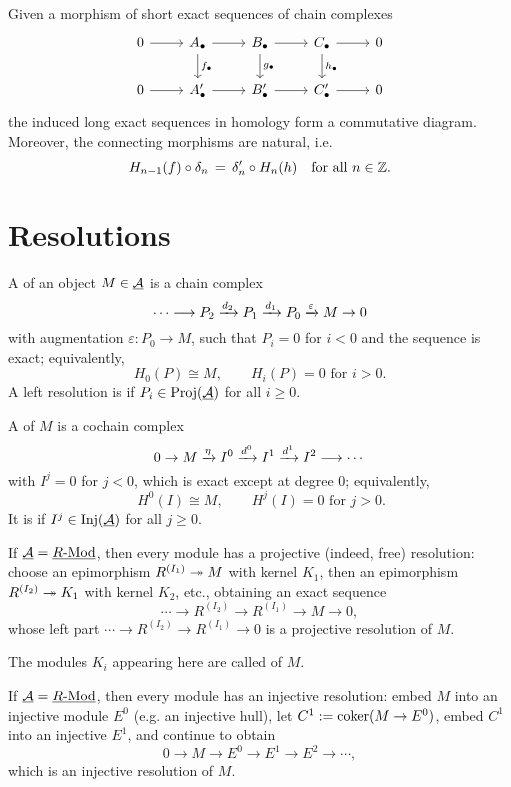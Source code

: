 \begin{proposition*}
	Given a morphism of short exact sequences of chain complexes
	\[
		\begin{tikzcd}
			0 \arrow[r] & A_{\bullet} \arrow[r] \arrow[d,"f_{\bullet}"] & B_{\bullet} \arrow[r] \arrow[d,"g_{\bullet}"] & C_{\bullet} \arrow[r] \arrow[d,"h_{\bullet}"] & 0 \\
			0 \arrow[r] & A'_{\bullet} \arrow[r] & B'_{\bullet} \arrow[r] & C'_{\bullet} \arrow[r] & 0
		\end{tikzcd}
	\]
	the induced long exact sequences in homology form a commutative diagram. Moreover, the connecting morphisms are natural, i.e.
	\[
		H_{n-1}(f) \circ \delta_n \,=\, \delta'_n \circ H_n(h) \quad \text{for all } n \in \mathbb{Z} .
	\]
\end{proposition*}

\section{Resolutions}

\begin{definitions*}
	\item A  of an object \( M \in \underline{\mathcal{A}} \) is a chain complex
		\[
			\dotsm \longrightarrow P_2 \xrightarrow{d_2} P_1 \xrightarrow{d_1} P_0 \xrightarrow{\varepsilon} M \to 0
		\]
		with augmentation \( \varepsilon: P_0 \to M \), such that \( P_i = 0 \) for \( i < 0 \) and the sequence is exact; equivalently,
		\[
			H_0(P) \cong M, \qquad H_i(P) = 0 \text{ for } i>0 .
		\]
		A left resolution is  if \( P_i \in \operatorname{Proj}(\underline{\mathcal{A}}) \) for all \( i \ge 0 \).
	\item A  of \( M \) is a cochain complex
		\[
			0 \to M \xrightarrow{\eta} I^0 \xrightarrow{d^0} I^1 \xrightarrow{d^1} I^2 \longrightarrow \dotsm
		\]
		with \( I^j = 0 \) for \( j<0 \), which is exact except at degree \( 0 \); equivalently,
		\[
			\ H^0(I) \cong M, \qquad H^j(I) = 0 \text{ for } j>0 .
		\]
		It is  if \( I^j \in \operatorname{Inj}(\underline{\mathcal{A}}) \) for all \( j \ge 0 \).
\end{definitions*}

\begin{examples*}
	\item If \( \underline{\mathcal{A}} = \underline{R\text{-}\mathrm{Mod}} \), then every module has a projective (indeed, free) resolution: choose an epimorphism \( R^{(I_1)} \twoheadrightarrow M \) with kernel \( K_1 \), then an epimorphism \( R^{(I_2)} \twoheadrightarrow K_1 \) with kernel \( K_2 \), etc., obtaining an exact sequence
		\[
			\dotsm \to R^{(I_2)} \to R^{(I_1)} \to M \to 0,
		\]
		whose left part \( \dotsm \to R^{(I_2)} \to R^{(I_1)} \to 0 \) is a projective resolution of \( M \).

	\item The modules \( K_i \) appearing here are called  of \( M \).
	\item If \( \underline{\mathcal{A}} = \underline{R\text{-}\mathrm{Mod}} \), then every module has an injective resolution: embed \( M \) into an injective module \( E^0 \) (e.g. an injective hull), let \( C^1 := \operatorname{coker}(M \to E^0) \), embed \( C^1 \) into an injective \( E^1 \), and continue to obtain
		\[
			0 \to M \to E^0 \to E^1 \to E^2 \to \dotsm,
		\]
		which is an injective resolution of \( M \).
\end{examples*}

